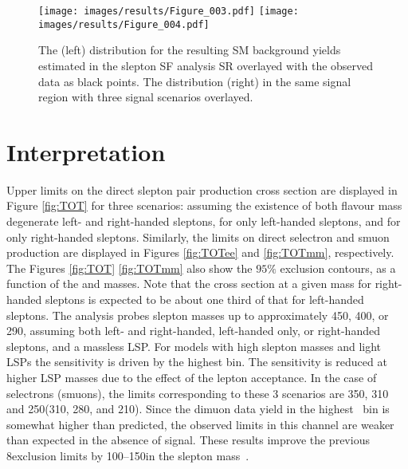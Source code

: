 \begin{figure}[ht!]
\centering
\texttt{[image: images/results/Figure\_003.pdf]}
\texttt{[image: images/results/Figure\_004.pdf]}
\caption{The \ptmiss (left) distribution for the resulting SM background yields estimated in the slepton SF analysis SR overlayed with the observed data as black points.
The \mttwo distribution (right) in the same signal region with three signal scenarios overlayed.}
\label{fig:results}
\end{figure}
\section{Interpretation}
\noindent
\justify
Upper limits on the direct slepton pair production cross section are displayed in Figure \ref{fig:TOT} for three scenarios: assuming the existence of both flavour mass degenerate left- and
right-handed sleptons, for only left-handed sleptons, and for only right-handed sleptons. 
Similarly, the limits on direct selectron and smuon production are displayed in Figures \ref{fig:TOTee} and \ref{fig:TOTmm}, respectively.
The Figures \ref{fig:TOT} \ref{fig:TOTmm} also show the $95\%$ \CL exclusion contours, as a function of the \slep and \lsp masses.
Note that the cross section at a given mass for right-handed sleptons is expected to be about one third of that for left-handed sleptons.
The analysis probes slepton masses up to approximately 450, 400, or 290\GeV, assuming both left- and right-handed, left-handed only, or right-handed sleptons, and a massless LSP.
For models with high slepton masses and light LSPs the sensitivity is driven by the highest \ptmiss bin. The sensitivity is reduced at higher LSP masses due to the effect of the lepton acceptance.
In the case of selectrons (smuons), the limits corresponding to these 3 scenarios are 350, 310 and 250\GeV (310, 280, and 210\GeV).
Since the dimuon data yield in the highest \ptmiss\ bin is somewhat higher than predicted, the observed limits in this channel are weaker than expected in the absence of signal.
These results improve the previous 8\TeV exclusion limits by 100--150\GeV in the slepton mass~\cite{2012ewk}.
